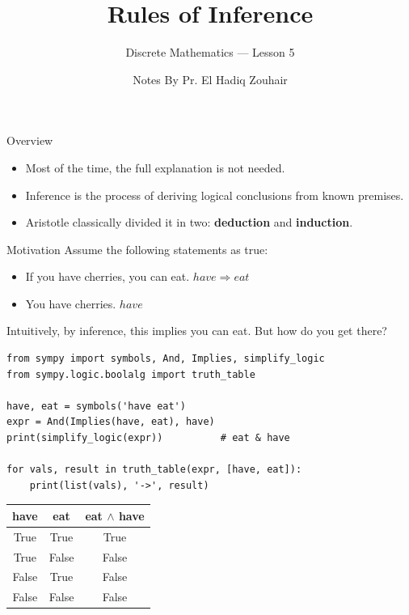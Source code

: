 \documentclass[aspectratio=169]{beamer}
\title{Rules of Inference}
\subtitle{Discrete Mathematics --- Lesson 5}
\author{Notes By Pr. El Hadiq Zouhair}
\date{}
\begin{document}
\begin{frame}
  \titlepage
\end{frame}

\begin{frame}{Overview}
  \begin{itemize}
    \item Most of the time, the full explanation is not needed.
    \item Inference is the process of deriving logical conclusions from known premises.
    \item Aristotle classically divided it in two: \textbf{deduction} and \textbf{induction}.
  \end{itemize}
\end{frame}

\begin{frame}[fragile]{Motivation}
  Assume the following statements as true:
  \begin{itemize}
    \item If you have cherries, you can eat. \quad $\mathit{have} \Rightarrow \mathit{eat}$
    \item You have cherries. \quad $\mathit{have}$
  \end{itemize}
  Intuitively, by inference, this implies you can eat. But how do you get there?

  \begin{lstlisting}[style=python]
from sympy import symbols, And, Implies, simplify_logic
from sympy.logic.boolalg import truth_table

have, eat = symbols('have eat')
expr = And(Implies(have, eat), have)
print(simplify_logic(expr))          # eat & have

for vals, result in truth_table(expr, [have, eat]):
    print(list(vals), '->', result)
  \end{lstlisting}

  \smallskip
  \begin{center}
    \renewcommand{\arraystretch}{1.3}
    \begin{tabular}{|c|c|c|}
      \hline
      \textbf{have} & \textbf{eat} & \textbf{eat $\wedge$ have} \\
      \hline
      \rowcolor{rowred}  True  & True  & True  \\
      \rowcolor{rowblue} True  & False & False \\
      \rowcolor{rowblue} False & True  & False \\
      \rowcolor{rowblue} False & False & False \\
      \hline
    \end{tabular}
  \end{center}
\end{frame}
\end{document}

